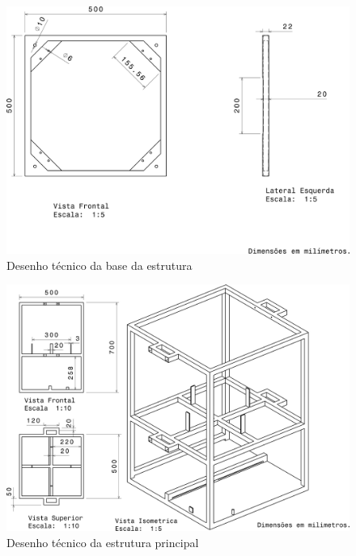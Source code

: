 \begin{figure}[H]
	\centering
	\includegraphics[scale=.5]{figuras/desenho_base.png}
	\caption{Desenho técnico da base da estrutura}
\end{figure}


\begin{figure}[H]
	\centering
	\includegraphics[scale=.5]{figuras/desenho_estrutura.png}
	\caption{Desenho técnico da estrutura principal}
\end{figure}


